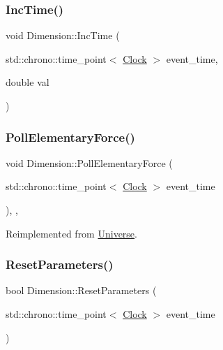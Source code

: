 \mbox{\label{classDimension_afc61c6d6d68ec0ed461458d504fec16f}} 
\subsubsection{\texorpdfstring{Inc\+Time()}{IncTime()}}
{\footnotesize\ttfamily void Dimension\+::\+Inc\+Time (\begin{DoxyParamCaption}\item[{std\+::chrono\+::time\+\_\+point$<$ \mbox{\hyperlink{universe_8h_a0ef8d951d1ca5ab3cfaf7ab4c7a6fd80}{Clock}} $>$}]{event\+\_\+time,  }\item[{double}]{val }\end{DoxyParamCaption})}

\mbox{\label{classDimension_a5b07f5c8558233c8f3488baf1fe3459a}} 
\subsubsection{\texorpdfstring{Poll\+Elementary\+Force()}{PollElementaryForce()}}
{\footnotesize\ttfamily void Dimension\+::\+Poll\+Elementary\+Force (\begin{DoxyParamCaption}\item[{std\+::chrono\+::time\+\_\+point$<$ \mbox{\hyperlink{universe_8h_a0ef8d951d1ca5ab3cfaf7ab4c7a6fd80}{Clock}} $>$}]{event\+\_\+time }\end{DoxyParamCaption})\hspace{0.3cm}{\ttfamily [inline]}, {\ttfamily [final]}, {\ttfamily [virtual]}}



Reimplemented from \mbox{\hyperlink{classUniverse_a0c485c504542409cbb5cfd8543c35b11}{Universe}}.

\mbox{\label{classDimension_af83732dba929ae01aca457e7d6121374}} 
\subsubsection{\texorpdfstring{Reset\+Parameters()}{ResetParameters()}}
{\footnotesize\ttfamily bool Dimension\+::\+Reset\+Parameters (\begin{DoxyParamCaption}\item[{std\+::chrono\+::time\+\_\+point$<$ \mbox{\hyperlink{universe_8h_a0ef8d951d1ca5ab3cfaf7ab4c7a6fd80}{Clock}} $>$}]{event\+\_\+time }\end{DoxyParamCaption})}

